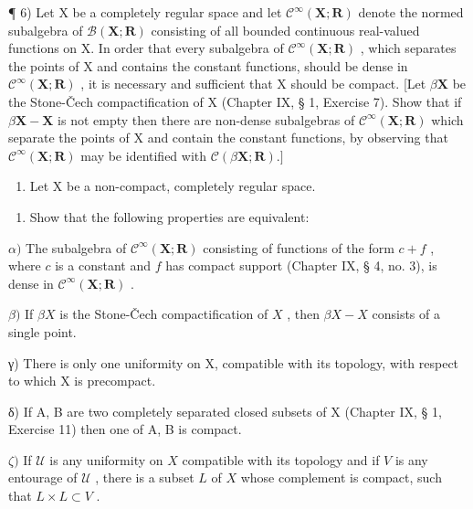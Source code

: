 ¶ 6) Let X be a completely regular space and let \(\mathcal{C}^{\infty}(\mathbf{X};\mathbf{R})\) denote the normed subalgebra of \(\mathcal{B}(\mathbf{X};\mathbf{R})\) consisting of all bounded continuous real-valued functions on X. In order that every subalgebra of \(\mathcal{C}^{\infty}(\mathbf{X};\mathbf{R})\) , which separates the points of X and contains the constant functions, should be dense in \(\mathcal{C}^{\infty}(\mathbf{X};\mathbf{R})\) , it is necessary and sufficient that X should be compact. {[}Let \(\beta\mathbf{X}\) be the Stone-Čech compactification of X (Chapter IX, § 1, Exercise 7). Show that if \(\beta\mathbf{X}-\mathbf{X}\) is not empty then there are non-dense subalgebras of \(\mathcal{C}^{\infty}(\mathbf{X};\mathbf{R})\) which separate the points of X and contain the constant functions, by observing that \(\mathcal{C}^{\infty}(\mathbf{X};\mathbf{R})\) may be identified with \(\mathcal{C}(\beta\mathbf{X};\mathbf{R}).]\)

\begin{enumerate}
\def\labelenumi{\arabic{enumi})}
\setcounter{enumi}{6}
\tightlist
\item
  Let X be a non-compact, completely regular space.
\end{enumerate}

\begin{enumerate}
\def\labelenumi{\alph{enumi})}
\tightlist
\item
  Show that the following properties are equivalent:
\end{enumerate}

\(\alpha)\) The subalgebra of \(\mathcal{C}^{\infty}(\mathbf{X};\mathbf{R})\) consisting of functions of the form \(c + f\) , where \(c\) is a constant and \(f\) has compact support (Chapter IX, § 4, no. 3), is dense in \(\mathcal{C}^{\infty}(\mathbf{X};\mathbf{R})\) .

\(\beta)\) If \(\beta X\) is the Stone-Čech compactification of \(X\) , then \(\beta X - X\) consists of a single point.

γ) There is only one uniformity on X, compatible with its topology, with respect to which X is precompact.

δ) If A, B are two completely separated closed subsets of X (Chapter IX, § 1, Exercise 11) then one of A, B is compact.

\(\zeta)\) If \(\mathcal{U}\) is any uniformity on \(X\) compatible with its topology and if \(V\) is any entourage of \(\mathcal{U}\) , there is a subset \(L\) of \(X\) whose complement is compact, such that \(L \times L \subset V\) .

